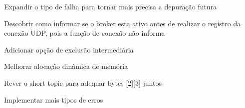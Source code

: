 
\begin{DoxyRefList}
\item[\label{todo__todo000005}%
\hypertarget{todo__todo000005}{}%
Global \hyperlink{mqtt__sn_8h_a172afa34fe10ad1ee4ffc0d226b35b4d}{mqtt\+\_\+sn\+\_\+check\+\_\+rc} (uint8\+\_\+t rc)]Expandir o tipo de falha para tornar mais precisa a depuração futura  
\item[\label{todo__todo000006}%
\hypertarget{todo__todo000006}{}%
Global \hyperlink{mqtt__sn_8h_a707413f00362e05c733c2b2f5f3c138c}{mqtt\+\_\+sn\+\_\+create\+\_\+sck} (\hyperlink{structmqtt__sn__t}{mqtt\+\_\+sn\+\_\+t} mqtt\+\_\+sn\+\_\+connection, char $\ast$topics\mbox{[}\mbox{]}, size\+\_\+t topic\+\_\+len)]Descobrir como informar se o broker esta ativo antes de realizar o registro da conexão U\+D\+P, pois a função de conexão não informa  
\item[\label{todo__todo000004}%
\hypertarget{todo__todo000004}{}%
Global \hyperlink{mqtt__sn_8h_ad0a729c99366dad086be6be954e71f2c}{mqtt\+\_\+sn\+\_\+delete\+\_\+queue} ()]Adicionar opção de exclusão intermediária  
\item[\label{todo__todo000003}%
\hypertarget{todo__todo000003}{}%
Global \hyperlink{mqtt__sn_8h_a575514d0f0fd3b6c5c4a2c75e604bf79}{mqtt\+\_\+sn\+\_\+insert\+\_\+queue} (\hyperlink{structmqtt__sn__task__t}{mqtt\+\_\+sn\+\_\+task\+\_\+t} new)]Melhorar alocação dinâmica de memória  
\item[\label{todo__todo000001}%
\hypertarget{todo__todo000001}{}%
Global \hyperlink{mqtt__sn_8h_af9146fa082fe2bc6612fb13dbb20ed36}{mqtt\+\_\+sn\+\_\+recv\+\_\+parser} (const uint8\+\_\+t $\ast$data)]Rever o short topic para adequar bytes \mbox{[}2\mbox{]}\mbox{[}3\mbox{]} juntos  
\item[\label{todo__todo000002}%
\hypertarget{todo__todo000002}{}%
Global \hyperlink{mqtt__sn_8h_a754c1055b4431040415cf01b39caaa98ae7b7a388c90c2c5428cced225760885f}{S\+U\+C\+C\+E\+S\+S\+\_\+\+C\+O\+N} ]Implementar mais tipos de erros 
\end{DoxyRefList}